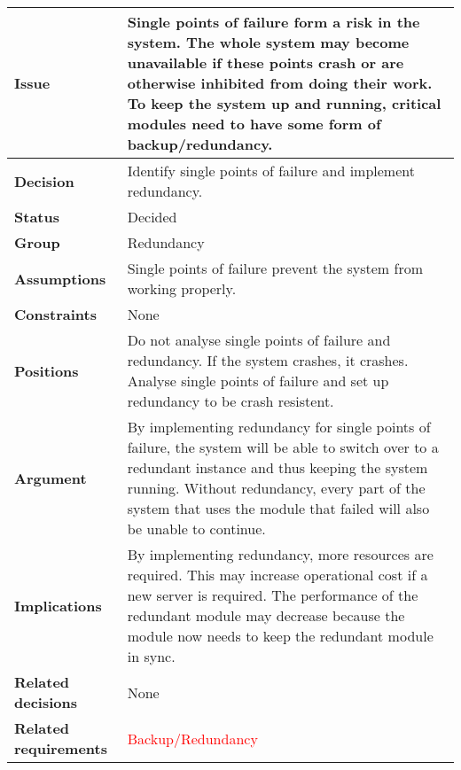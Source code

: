 
\label{dd:redundancy}
\begin{tabular}{ l  p{10cm}}
\hline
\bf Issue & Single points of failure form a risk in the system. The whole system may become unavailable if these points crash or are otherwise inhibited from doing their work. To keep the system up and running, critical modules need to have some form of backup/redundancy. \\
\hline
\bf Decision & Identify single points of failure and implement redundancy. \\
\hline
\bf Status & Decided \\
\hline
\bf Group & Redundancy \\
\hline
\bf Assumptions & Single points of failure prevent the system from working properly. \\
\hline
\bf Constraints & None \\
\hline
\bf Positions & Do not analyse single points of failure and redundancy. If the system crashes, it crashes. \newline \newline
Analyse single points of failure and set up redundancy to be crash resistent. \\
\hline
\bf Argument & By implementing redundancy for single points of failure, the system will be able to switch over to a redundant instance and thus keeping the system running. Without redundancy, every part of the system that uses the module that failed will also be unable to continue. \\
\hline
\bf Implications & By implementing redundancy, more resources are required. This may increase operational cost if a new server is required. The performance of the redundant module may decrease because the module now needs to keep the redundant module in sync. \\
\hline
\bf Related decisions & None \\
\hline
\bf Related requirements & \textcolor{red}{Backup/Redundancy} \\
\hline
\end{tabular}

